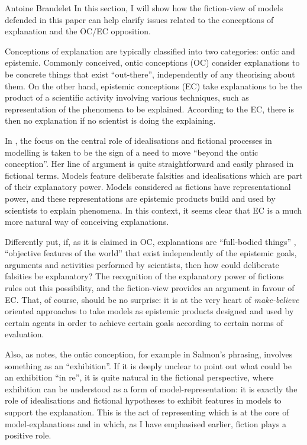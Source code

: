 \begin{artengenv}{Antoine Brandelet}
In this section, I will show how the fiction-view of models defended in this paper can help clarify issues related to the conceptions of explanation and the OC/EC opposition.

Conceptions of explanation are typically classified into two categories: ontic and epistemic. Commonly conceived, ontic conceptions (OC) consider explanations to be concrete things that exist ``out-there'', independently of any theorising about them. On the other hand, epistemic conceptions (EC) take explanations to be the product of a scientific activity involving various techniques, such as representation of the phenomena to be explained. According to the EC, there is then no explanation if no scientist is doing the explaining.

In \parencite{Bokulich2016}, the focus on the central role of idealisations and fictional processes in modelling is taken to be the sign of a need to move ``beyond the ontic conception''. Her line of argument is quite straightforward and easily phrased in fictional terms. Models feature deliberate falsities and idealisations which are part of their explanatory power. Models considered as fictions have representational power, and these representations are epistemic products build and used by scientists to explain phenomena. In this context, it seems clear that EC is a much more natural way of conceiving explanations.

Differently put, if, as it is claimed in OC, explanations are ``full-bodied things'' \parencite[p.40]{Craver2014}, ``objective features of the world'' \parencite[p.27]{Craver2007} that exist independently of the epistemic goals, arguments and activities performed by scientists, then how could deliberate falsities be explanatory? The recognition of the explanatory power of fictions rules out this possibility, and the fiction-view provides an argument in favour of EC. That, of course, should be no surprise: it is at the very heart of \textit{make-believe} oriented approaches to take models as epistemic products designed and used by certain agents in order to achieve certain goals according to certain norms of evaluation.

Also, as \parencite{Wright2015} notes, the ontic conception, for example in Salmon's phrasing, involves something as an ``exhibition''. If it is deeply unclear to point out what could be an exhibition ``in re'', it is quite natural in the fictional perspective, where exhibition can be understood as a form of model-representation: it is exactly the role of idealisations and fictional hypotheses to exhibit features in models to support the explanation. This is the act of representing which is at the core of model-explanations and in which, as I have emphasised earlier, fiction plays a positive role.


\end{artengenv}
